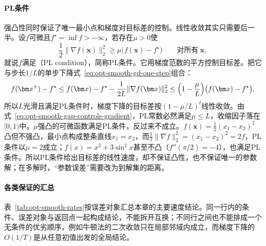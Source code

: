 \paragraph{PL条件}
强凸性同时保证了唯一最小点和梯度对目标差的控制。线性收敛其实只需要后一半。设$f$可微且$f^\star=\inf f>-\infty$，若存在$\mu>0$使
\begin{equation}
\label{eq:opt-smooth-pl}
  \frac12\lVert\nabla f(\bm x)\rVert_2^2\geq\mu\bigl(f(\bm x)-f^\star\bigr)\qquad\text{对所有}\ \bm x ,
\end{equation}
就说$f$满足（PL condition），简称PL条件\cite{karimi2016pl}。它用梯度范数的平方控制目标差。把它与步长$1/L$的单步下降式~\eqref{eq:opt-smooth-gd-one-step}组合：
\[
  f(\bm x^+)-f^\star\leq f(\bm x)-f^\star-\frac1{2L}\lVert\nabla f(\bm x)\rVert_2^2\leq\Bigl(1-\frac\mu L\Bigr)\bigl(f(\bm x)-f^\star\bigr),
\]
所以$L$光滑且满足PL条件时，梯度下降的目标差按$(1-\mu/L)^t$线性收敛。由式~\eqref{eq:opt-smooth-gap-controls-gradient}，PL常数必然满足$\mu\leq L$，收缩因子落在$[0,1)$中。$\mu$强凸的可微函数满足PL条件，反过来不成立。$f(\bm x)=\tfrac12(x_1-x_2)^2$凸但不强凸，最小点构成整条直线$x_1=x_2$，而$\tfrac12\lVert\nabla f\rVert_2^2=(x_1-x_2)^2=2f$，PL条件以$\mu=2$成立；$f(x)=x^2+3\sin^2x$甚至不凸（$f''(\pi/2)=-4$），也满足PL条件\cite{karimi2016pl}。所以PL条件给出目标差的线性速度，却不保证凸性，也不保证唯一的参数解；在多解时，“参数误差”需要改为到解集的距离。

\paragraph{各类保证的汇总}
表~\ref{tab:opt-smooth-rates}按误差对象汇总本章的主要速度结论。同一行内的条件、误差对象与返回点一起构成结论，不能拆开互换；不同行之间也不能排成一个无条件的优劣顺序，例如牛顿法的二次收敛只在局部邻域内成立，而梯度下降的$O(1/T)$是从任意初值出发的全局结论。

